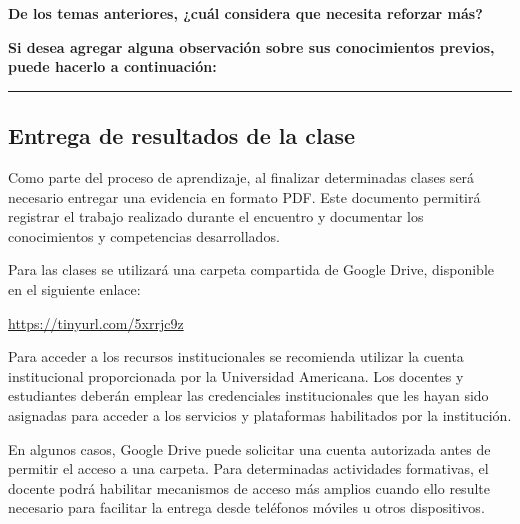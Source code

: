 \documentclass[12pt,a4paper]{article}
\begin{document}
\normalsize

\vspace{0.5cm}

\noindent
\textbf{De los temas anteriores, ¿cuál considera que necesita reforzar más?}

\vspace{0.3cm}

\begin{center}
\end{center}

\vspace{0.4cm}

\noindent
\textbf{Si desea agregar alguna observación sobre sus conocimientos previos, puede hacerlo a continuación:}

\vspace{1.5cm}

\noindent
\rule{\textwidth}{0.4pt}

\subsection{Entrega de resultados de la clase}

Como parte del proceso de aprendizaje, al finalizar determinadas clases será necesario entregar una evidencia en formato PDF. Este documento permitirá registrar el trabajo realizado durante el encuentro y documentar los conocimientos y competencias desarrollados.

Para las clases se utilizará una carpeta compartida de Google Drive, disponible en el siguiente enlace:

\begin{center}
\url{https://tinyurl.com/5xrrjc9z}
\end{center}

Para acceder a los recursos institucionales se recomienda utilizar la cuenta institucional proporcionada por la Universidad Americana. Los docentes y estudiantes deberán emplear las credenciales institucionales que les hayan sido asignadas para acceder a los servicios y plataformas habilitados por la institución.

En algunos casos, Google Drive puede solicitar una cuenta autorizada antes de permitir el acceso a una carpeta. Para determinadas actividades formativas, el docente podrá habilitar mecanismos de acceso más amplios cuando ello resulte necesario para facilitar la entrega desde teléfonos móviles u otros dispositivos.
\end{document}

